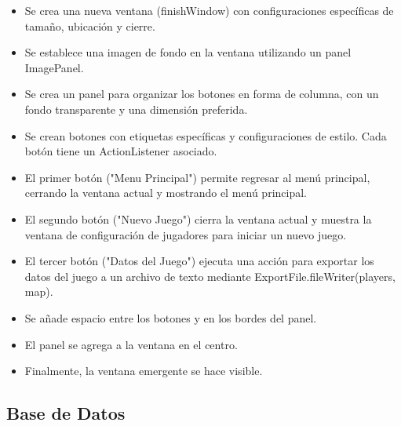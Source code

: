 \documentclass{article}
\begin{document}
    \begin{itemize}	
            \item Se crea una nueva ventana (finishWindow) con configuraciones específicas de tamaño, ubicación y cierre.
            \item Se establece una imagen de fondo en la ventana utilizando un panel ImagePanel.
            \item Se crea un panel para organizar los botones en forma de columna, con un fondo transparente y una dimensión preferida.
            \item Se crean botones con etiquetas específicas y configuraciones de estilo. Cada botón tiene un ActionListener asociado.
            \item El primer botón ("Menu Principal") permite regresar al menú principal, cerrando la ventana actual y mostrando el menú principal.
            \item El segundo botón ("Nuevo Juego") cierra la ventana actual y muestra la ventana de configuración de jugadores para iniciar un nuevo juego.
            \item El tercer botón ("Datos del Juego") ejecuta una acción para exportar los datos del juego a un archivo de texto mediante ExportFile.fileWriter(players, map).
            \item Se añade espacio entre los botones y en los bordes del panel.
            \item El panel se agrega a la ventana en el centro.
            \item Finalmente, la ventana emergente se hace visible.
	\end{itemize}
	

\newpage







\subsection{Base de Datos}

	
\end{document}
